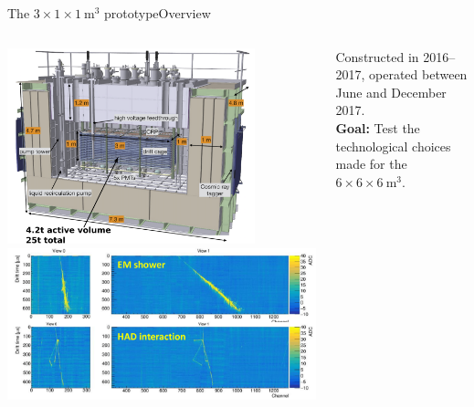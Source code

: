 \documentclass[10pt]{beamer}
\begin{document}
    \begin{frame}{The \texorpdfstring{$3 \times 1 \times \SI{1}{\meter\cubed}$}{311} prototype}{Overview}
    	\begin{scriptsize}
    		\vfill
    		\begin{columns}
    			\begin{column}{0.48\textwidth}
    				\centering
    				\includegraphics[width=0.8\textwidth]{figures/311/311_2.png}\\
    				\vspace{0.3cm}
    				\includegraphics[width=\textwidth]{figures/311/events.png}\\
    			\end{column}\hfill
    			\begin{column}{0.48\textwidth}
    				Constructed in 2016--2017, operated between June and December 2017.\\
    				\vspace{0.3cm}
    				\textbf{Goal:} Test the technological choices made for the $6 \times 6 \times \SI{6}{\meter\cubed}$.\\

\end{column}
\end{columns}
\end{scriptsize}
\end{frame}
\end{document}
